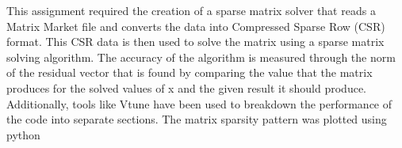 This assignment required the creation of a sparse matrix solver that reads a Matrix Market file
and converts the data into Compressed Sparse Row (CSR) format. This CSR data is then used
to solve the matrix using a sparse matrix solving algorithm. The accuracy of the algorithm is
measured through the norm of the residual vector that is found by comparing the value that the
matrix produces for the solved values of x and the given result it should produce.
Additionally, tools like Vtune have been used to breakdown the performance of the code into
separate sections. The matrix sparsity pattern was plotted using python

